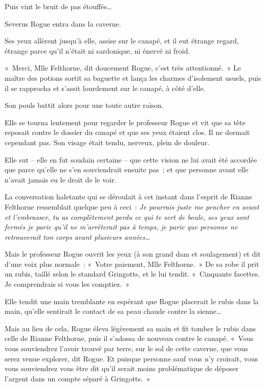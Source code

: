Puis vint le bruit de pas étouffés…

Severus Rogue entra dans la caverne.

Ses yeux allèrent jusqu'à elle, assise sur le canapé, et il eut étrange regard, étrange parce qu'il n'était ni sardonique, ni énervé ni froid.

«~Merci, Mlle Felthorne, dit doucement Rogue, c'est très attentionné.~»
Le maître des potions sortit sa baguette et lança les charmes d'isolement usuels, puis il se rapprocha et s'assit lourdement sur le canapé, à côté d'elle.

Son pouls battit alors pour une toute autre raison.

Elle se tourna lentement pour regarder le professeur Rogue et vit que sa tête reposait contre le dossier du canapé et que ses yeux étaient clos.
Il ne dormait cependant pas.
Son visage était tendu, nerveux, plein de douleur.

Elle sut -- elle en fut soudain certaine -- que cette vision ne lui avait été accordée que parce qu'elle ne s'en souviendrait ensuite pas~; et que personne avant elle n'avait jamais eu le droit de le voir.

La conversation haletante qui se déroulait à cet instant dans l'esprit de Rianne Felthorne ressemblait quelque peu à ceci~: \emph{Je pourrais juste me pencher en avant et l'embrasser, tu as complètement perdu ce qui te sert de boule, ses yeux sont fermés je parie qu'il ne m'arrêterait pas à temps, je parie que personne ne retrouverait ton corps avant plusieurs années…}

Mais le professeur Rogue ouvrit les yeux (à son grand dam et soulagement) et dit d'une voix plus normale~: «~Votre paiement, Mlle Felthorne.~»
De sa robe il prit un rubis, taillé selon le standard Gringotts, et le lui tendit.
«~Cinquante facettes.
Je comprendrais si vous les comptiez.~»

Elle tendit une main tremblante en espérant que Rogue placerait le rubis dans la main, qu'elle sentirait le contact de sa peau chaude contre la sienne…

Mais au lieu de cela, Rogue éleva légèrement sa main et fit tomber le rubis dans celle de Rianne Felthorne, puis il s'adossa de nouveau contre le canapé.
«~Vous vous souviendrez l'avoir trouvé par terre, sur le sol de cette caverne, que vous serez venue explorer, dit Rogue.
Et puisque personne sauf vous n'y croirait, vous vous souviendrez vous être dit qu'il serait moins problématique de déposer l'argent dans un compte séparé à Gringotts.~»

